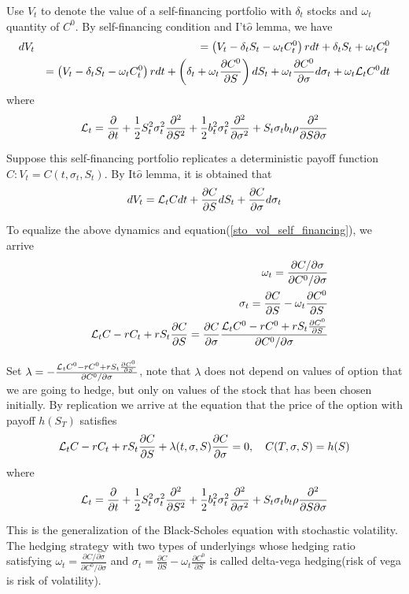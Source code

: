 \documentclass[10pt]{article}
\theoremstyle{plain}
\numberwithin{equation}{section}
\numberwithin{table}{section}
\newcommand{\s}{\sigma}
\newcommand{\om}{\omega}
\newcommand{\prt}[1]{\left( #1 \right)}  %
\newcommand{\de}{\delta}
\newcommand{\pa}{\partial}
\begin{document}
Use $V_t$ to denote the value of a self-financing portfolio with $\de_t$ stocks and $\om_t$ quantity of $C^0$. By self-financing condition and I't$\hat{o}$ lemma, we have
\begin{eqnarray}
    dV_t &&= \prt{V_t - \de_tS_t - \om_tC^0_t} rdt + \de_tS_t + \om_tC^0_t \nonumber \\
    && =  \prt{V_t - \de_tS_t - \om_tC^0_t} rdt + \prt{\de_t + \om_t \frac{\pa C^0}{\pa S}}dS_t + \om_t \frac{\pa C^0}{\pa \s} d\s_t + \om_t {\cal{L}}_t C^0 dt
    \label{sto_vol_self_financing}
\end{eqnarray}
where 
\[
    {\cal{L}}_t = \frac{\pa}{\pa t} + \frac{1}{2} S_t^2 \s_t^2 \frac{\pa^2}{\pa S^2} + \frac{1}{2} b_t^2 \s_t^2 \frac{\pa^2}{\pa \s^2} + S_t\s_t b_t\rho \frac{\pa^2}{\pa S \pa \s}
\]

Suppose this self-financing portfolio replicates a deterministic payoff function $C: V_t =C(t, \s_t, S_t)$. By It$\hat{o}$ lemma, it is obtained that
\[
    dV_t = {\cal{L}}_t C dt + \frac{\pa C}{ \pa S}dS_t + \frac{\pa C}{ \pa \s}d\s_t 
\]

To equalize the above dynamics and equation(\ref{sto_vol_self_financing}), we arrive 
\begin{eqnarray*}
    && \om_t = \frac{\pa C / \pa \s}{\pa C^0 / \pa \s}   \\
    && \s_t = \frac{\pa C}{\pa S} - \om_t \frac{\pa C^0}{\pa S}\\
    && {\cal{L}}_tC - rC_t + rS_t \frac{\pa C}{\pa S} = \frac{\pa C}{\pa \s}  \frac{{\cal{L}}_t C^0 - rC^0 + rS_t \frac{\pa C^0}{\pa S}}{\pa C^0 / \pa \s}
\end{eqnarray*}

Set $\lambda = - \frac{{\cal{L}}_t C^0 - rC^0 + rS_t \frac{\pa C^0}{\pa S}}{\pa C^0 / \pa \s}$, note that $\lambda$ does not depend on values of option that we are going to hedge, but 
only on values of the stock that has been chosen initially. By replication we arrive at the equation that the price of the option with payoff $h(S_T)$ satisfies
\begin{eqnarray}
    {\cal{L}}_tC - rC_t + rS_t \frac{\pa C}{\pa S} + \lambda(t, \s, S) \frac{\pa C}{\pa \s}= 0, \quad C(T, \s, S) = h(S)    
    \label{stoch_vol_bs_sde}
\end{eqnarray} 
where 
\[
    {\cal{L}}_t = \frac{\pa}{\pa t} + \frac{1}{2} S_t^2 \s_t^2 \frac{\pa^2}{\pa S^2} + \frac{1}{2} b_t^2 \s_t^2 \frac{\pa^2}{\pa \s^2} + S_t\s_t b_t\rho \frac{\pa^2}{\pa S \pa \s}   
\]

This is the generalization of the Black-Scholes equation with stochastic volatility. The hedging strategy with two types of underlyings whose hedging ratio satisfying $\om_t = \frac{\pa C / \pa \s}{\pa C^0 / \pa \s}$ and 
$\s_t = \frac{\pa C}{\pa S} - \om_t \frac{\pa C^0}{\pa S}$ is called delta-vega hedging(risk of vega is risk of volatility).
\end{document}
